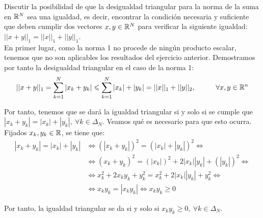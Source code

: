 \begin{ejercicio}
    Discutir la posibilidad de que la desigualdad triangular para la norma de la suma en $\mathbb{R}^N$ sea una igualdad, es decir, encontrar la condición necesaria y suﬁciente que deben cumplir dos vectores $x, y \in \mathbb{R}^N$ para veriﬁcar la siguiente igualdad: $ ||x + y||_1 =|| x||_1 +|| y||_1$.\\

    En primer lugar, como la norma 1 no procede de ningún producto escalar, tenemos que no son aplicables los resultados del ejercicio anterior. Demostramos por tanto la desigualdad triangular en el caso de la norma 1:
    \begin{equation*}
        ||x+y||_1 = \sum_{k=1}^N |x_k + y_k| \leqslant \sum_{k=1}^N |x_k| + |y_k| = ||x||_1 + ||y||_2, \hspace{1cm} \forall x,y\in \mathbb{R}^n
    \end{equation*}

    Por tanto, tenemos que se dará la igualdad triangular si y solo si se cumple que $|x_k + y_k| = |x_k| + |y_k|,~\forall k\in \Delta_N$. Veamos qué es necesario para que esto ocurra. Fijados $x_k, y_k\in \mathbb{R}$, se tiene que:
    \begin{align*}
        |x_k + y_k| = |x_k| + |y_k| &\Longleftrightarrow \left(|x_k + y_k|\right)^2 = \left(|x_k| + |y_k|\right)^2 \Longleftrightarrow \\
        &\Longleftrightarrow \left(x_k + y_k\right)^2 = \left(|x_k|\right)^2 + 2|x_k||y_k| + \left(|y_k|\right)^2 \Longleftrightarrow \\
        &\Longleftrightarrow x_k^2 + 2x_ky_k + y_k^2 = x_k^2 + 2|x_k||y_k| + y_k^2 \Longleftrightarrow \\
        &\Longleftrightarrow x_ky_k = |x_ky_k| \Longleftrightarrow x_ky_k \geq 0
    \end{align*}

    Por tanto, la igualdad triangular se da si y solo si $x_ky_k\geq 0,~\forall k\in \Delta_N$.
\end{ejercicio}

